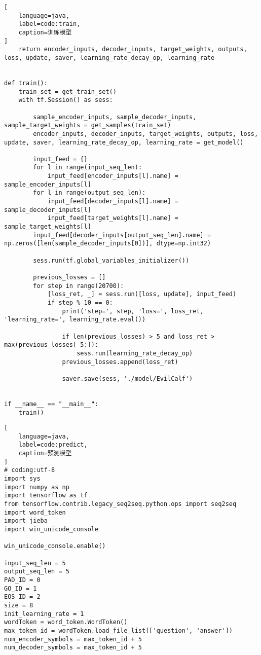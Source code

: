 \begin{appendices}
\begin{lstlisting}[
    language=java,
    label=code:train,
    caption=训练模型
]
    return encoder_inputs, decoder_inputs, target_weights, outputs, loss, update, saver, learning_rate_decay_op, learning_rate


def train():
    train_set = get_train_set()
    with tf.Session() as sess:

        sample_encoder_inputs, sample_decoder_inputs, sample_target_weights = get_samples(train_set)
        encoder_inputs, decoder_inputs, target_weights, outputs, loss, update, saver, learning_rate_decay_op, learning_rate = get_model()

        input_feed = {}
        for l in range(input_seq_len):
            input_feed[encoder_inputs[l].name] = sample_encoder_inputs[l]
        for l in range(output_seq_len):
            input_feed[decoder_inputs[l].name] = sample_decoder_inputs[l]
            input_feed[target_weights[l].name] = sample_target_weights[l]
        input_feed[decoder_inputs[output_seq_len].name] = np.zeros([len(sample_decoder_inputs[0])], dtype=np.int32)

        sess.run(tf.global_variables_initializer())

        previous_losses = []
        for step in range(20700):
            [loss_ret, _] = sess.run([loss, update], input_feed)
            if step % 10 == 0:
                print('step=', step, 'loss=', loss_ret, 'learning_rate=', learning_rate.eval())

                if len(previous_losses) > 5 and loss_ret > max(previous_losses[-5:]):
                    sess.run(learning_rate_decay_op)
                previous_losses.append(loss_ret)

                saver.save(sess, './model/EvilCalf')


if __name__ == "__main__":
    train()

\end{lstlisting}
\begin{lstlisting}[
    language=java,
    label=code:predict,
    caption=预测模型
]
# coding:utf-8
import sys
import numpy as np
import tensorflow as tf
from tensorflow.contrib.legacy_seq2seq.python.ops import seq2seq
import word_token
import jieba
import win_unicode_console

win_unicode_console.enable()

input_seq_len = 5
output_seq_len = 5
PAD_ID = 0
GO_ID = 1
EOS_ID = 2
size = 8
init_learning_rate = 1
wordToken = word_token.WordToken()
max_token_id = wordToken.load_file_list(['question', 'answer'])
num_encoder_symbols = max_token_id + 5
num_decoder_symbols = max_token_id + 5



\end{lstlisting}
\end{appendices}
